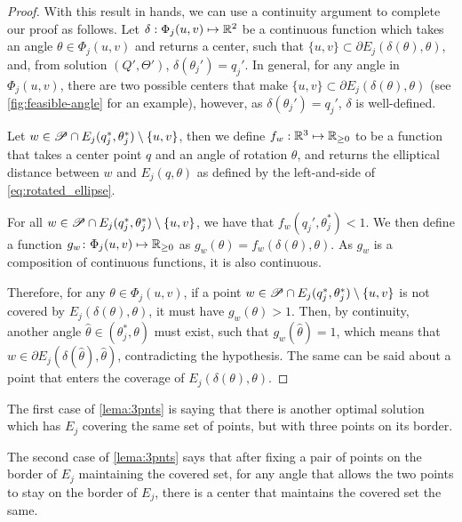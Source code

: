 \begin{proof}
	With this result in hands, we can use a continuity argument to complete our proof as follows.
	Let $\delta : \Phi_j(u,v) \mapsto \mathbb{R}^2$ be a continuous function which takes an angle $\theta\in\Phi_j(u,v)$ and returns a center, such that $\{u,v\} \subset \partial E_j(\delta(\theta), \theta)$, and, from solution $(Q', \Theta')$, $\delta(\theta_j') = q_j'$.
	In general, for any angle in $\Phi_j(u,v)$, there are two possible centers that make $\{u,v\} \subset \partial E_j(\delta(\theta), \theta)$ (see \autoref{fig:feasible-angle} for an example), however, as $\delta(\theta_j') = q_j'$, $\delta$ is well-defined.
	
	Let $w\in \mathscr{P} \cap E_j(q_j^*, \theta_j^*) \setminus \{u,v\}$, then we define $f_w  : \mathbb{R}^3 \mapsto \mathbb{R}_{\ge0}$ to be a function that takes a center point $q$ and an angle of rotation $\theta$, and returns the elliptical distance between $w$ and $E_j(q, \theta)$ as defined by the left-and-side of \autoref{eq:rotated_ellipse}.
	
	For all $w\in \mathscr{P} \cap E_j(q_j^*, \theta_j^*)\setminus \{u,v\}$, we have that $f_w(q_j', \theta_j^*) < 1$. We then define a function $g_w\colon \Phi_j(u,v) \mapsto \mathbb{R}_{\ge0}$ as $g_w(\theta) = f_w(\delta(\theta), \theta)$. As $g_w$ is a composition of continuous functions, it is also continuous.
	
	Therefore, for any $\theta\in\Phi_j(u,v)$, if a point $w \in \mathscr{P} \cap E_j(q_j^*, \theta_j^*)\setminus\{u,v\}$ is not covered by $E_j(\delta(\theta), \theta)$, it must have $g_w(\theta)>1$. Then, by continuity, another angle $\hat{\theta} \in(\theta_j^*, \theta)$ must exist, such that $g_w(\hat{\theta})=1$, which means that $w\in \partial E_j(\delta(\hat{\theta}), \hat{\theta})$, contradicting the hypothesis. The same can be said about a point that enters the coverage of $E_j(\delta(\theta), \theta)$.
\end{proof}



The first case of \autoref{lema:3pnts} is saying that there is another optimal solution which has $E_j$ covering the same set of points, but with three points on its border. 

The second case of \autoref{lema:3pnts} says that after fixing a pair of points on the border of $E_j$ maintaining the covered set, for any angle that allows the two points to stay on the border of $E_j$, there is a center that maintains the covered set the same.

